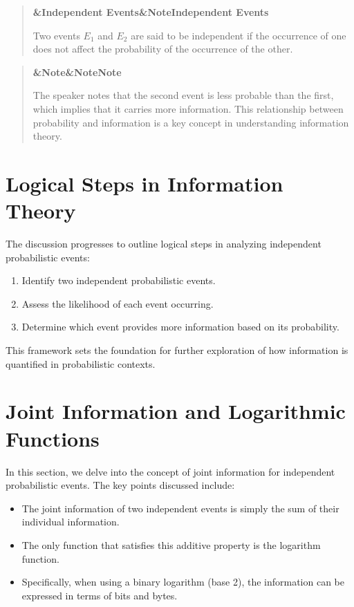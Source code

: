 \documentclass[a4paper]{article}
\newcommand{\boxheading}[1]{%
  \par\smallskip
  \noindent\textbf{\ifx&#1&Note\else#1\fi}\par
  \smallskip
}
\newenvironment{defbox}[1][]{%
  \begin{quote}\color{green!40!black}\boxheading{#1}\normalcolor
}{\end{quote}}
\newenvironment{rembox}[1][]{%
  \begin{quote}\color{black!70}\boxheading{#1}\normalcolor
}{\end{quote}}
\begin{document}
\begin{defbox}[Independent Events]
Two events \(E_1\) and \(E_2\) are said to be independent if the occurrence of one does not affect the probability of the occurrence of the other.
\end{defbox}

\begin{rembox}[Note]
The speaker notes that the second event is less probable than the first, which implies that it carries more information. This relationship between probability and information is a key concept in understanding information theory.
\end{rembox}

\section{Logical Steps in Information Theory}
The discussion progresses to outline logical steps in analyzing independent probabilistic events:

\begin{enumerate}
    \item Identify two independent probabilistic events.
    \item Assess the likelihood of each event occurring.
    \item Determine which event provides more information based on its probability.
\end{enumerate}

This framework sets the foundation for further exploration of how information is quantified in probabilistic contexts.

\section{Joint Information and Logarithmic Functions}
In this section, we delve into the concept of joint information for independent probabilistic events. The key points discussed include:

\begin{itemize}
    \item The joint information of two independent events is simply the sum of their individual information.
    \item The only function that satisfies this additive property is the logarithm function.
    \item Specifically, when using a binary logarithm (base 2), the information can be expressed in terms of bits and bytes.
\end{itemize}
\end{document}

